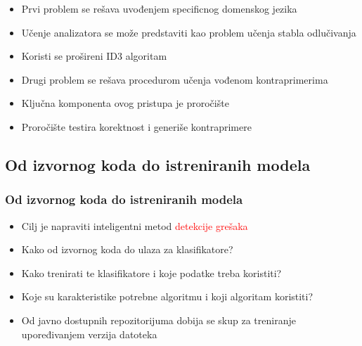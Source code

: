 \documentclass[11pt]{beamer}
\theoremstyle{definition}
\begin{document}
{\begin{frame}
\begin{itemize}
	\item Prvi problem se rešava uvođenjem specificnog domenskog jezika
	\item Učenje analizatora se može predstaviti kao problem učenja stabla odlučivanja
	\item Koristi se prošireni ID3 algoritam
	\item Drugi problem se rešava procedurom učenja vođenom kontraprimerima
	\item Ključna komponenta ovog pristupa je proročište
	\item Proročište testira korektnost i generiše kontraprimere
	
\end{itemize}
\end{frame}

\subsection{Od izvornog koda do istreniranih modela}
\label{subsec:WEKA}
\begin{frame}
\frametitle{Od izvornog koda do istreniranih modela}


\begin{itemize}
\item Cilj je napraviti inteligentni metod \textcolor{red}{detekcije grešaka}
\item Kako od izvornog koda do ulaza za klasifikatore?
\item Kako trenirati te klasifikatore i koje podatke treba koristiti?
\item Koje su karakteristike potrebne algoritmu i koji algoritam koristiti?

\item Od javno dostupnih repozitorijuma dobija se skup za treniranje upoređivanjem verzija datoteka

\end{itemize}
\end{frame}

{
\begin{frame}
\end{frame}
}

}
\end{document}
